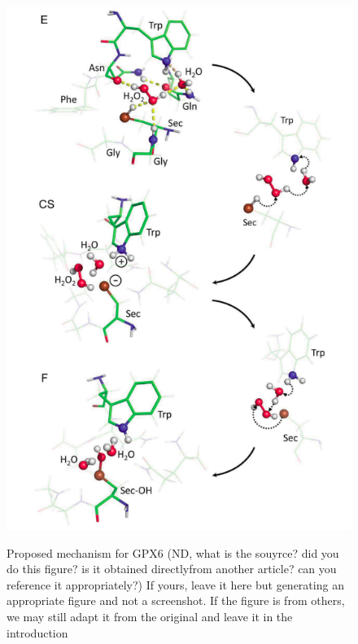 \begin{figure}
  \caption{Proposed mechanism for GPX6 (ND, what is the souyrce? did you do this figure? is it obtained directlyfrom another article? can you reference it appropriately?) If yours, leave it here but generating an appropriate figure and not a screenshot. If the figure is from others, we may still adapt it from the original and leave it in the introduction}
   \label{fgr:example}
   \includegraphics[width=\linewidth]{figures/mechanism.png} 
 \label{fig:mechanism}
 \end{figure}


